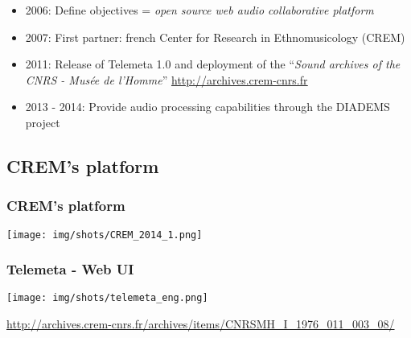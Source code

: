 \documentclass[10pt, final, hyperref, table]{beamer}
\newcommand{\dchref}[1]{
    \href{#1}{\color{rouge}\underline{#1}}
}
\begin{document}
\begin{frame}
\begin{block}
      \begin{itemize}
      \item \alert{2006}: Define objectives = \emph{open source web
          audio collaborative platform}
      \item \alert{2007}: First partner: french Center for Research in
        Ethnomusicology (CREM)
      \item \alert{2011}: Release of \alert{Telemeta 1.0} and
        deployment of the ``\emph{Sound archives of the CNRS
          - Musée de l'Homme}'' \dchref{http://archives.crem-cnrs.fr}
      \item \alert{2013 - 2014}: Provide audio processing capabilities through the DIADEMS project 
      \end{itemize}
    \end{block}
  
\end{frame}


\subsection{CREM's platform}
\begin{frame}
  \frametitle{CREM's platform}
  \begin{center}
    \texttt{[image: img/shots/CREM\_2014\_1.png]}
  \end{center}
\end{frame}

\begin{frame}\frametitle{Telemeta - Web UI}
  \vspace{-0.25cm}
  \begin{center}
    \texttt{[image: img/shots/telemeta\_eng.png]}
  \end{center}
  \tiny{\url{http://archives.crem-cnrs.fr/archives/items/CNRSMH_I_1976_011_003_08/}}
\end{frame}
\end{document}
